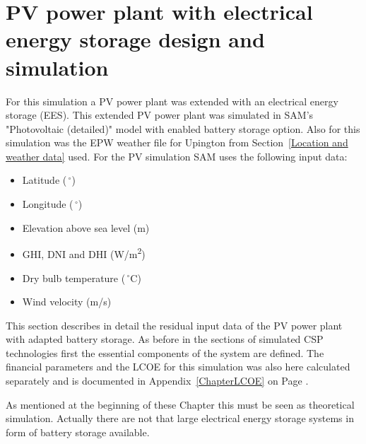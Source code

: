 \section{PV power plant with electrical energy storage design and simulation}
For this simulation a PV power plant was extended with an electrical energy storage (EES). This extended PV power plant was simulated in SAM's "Photovoltaic (detailed)" model with enabled battery storage option. Also for this simulation was the EPW weather file for Upington from Section~\ref{Location and weather data} used. For the PV simulation SAM uses the following input data:
\begin{itemize}
\item Latitude ($\,^{\circ}$)
\item Longitude ($\,^{\circ}$)
\item Elevation above sea level (m)
\item GHI, DNI and DHI (W/m\textsuperscript{2})
\item Dry bulb temperature ($\,^{\circ}\mathrm{C}$)
\item Wind velocity (m/s)
\end{itemize}
This section describes in detail the residual input data of the PV power plant with adapted battery storage. As before in the sections of simulated CSP technologies first the essential components of the system are defined. The financial parameters and the LCOE for this simulation was also here calculated separately and is documented in Appendix~\ref{ChapterLCOE} on Page \pageref{ChapterLCOE}.



As mentioned at the beginning of these Chapter this must be seen as theoretical simulation. Actually there are not that large electrical energy storage systems in form of battery storage available.



